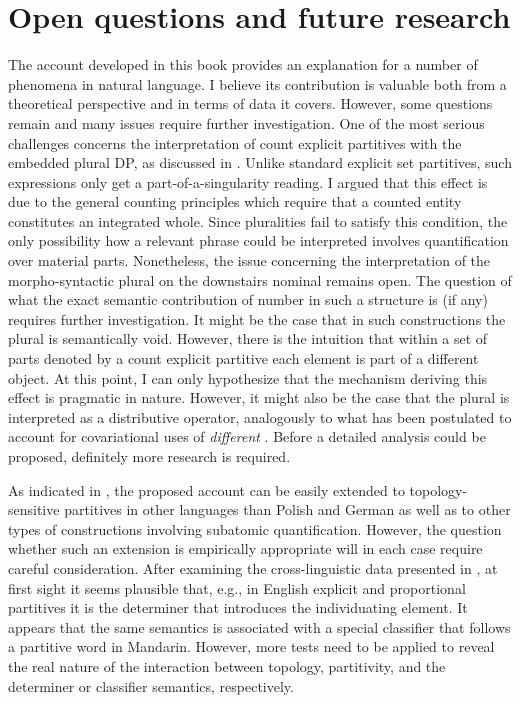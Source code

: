 \section{Open questions and future research}\label{sec:open-questions-and-future-research}

The account developed in this book provides an explanation for a number of phenomena in natural language. I believe its contribution is valuable both from a theoretical perspective and in terms of data it covers. However, some questions remain and many issues require further investigation. One of the most serious challenges concerns the interpretation of count explicit partitives with the embedded plural DP, as discussed in . Unlike standard explicit set partitives, such expressions only get a part-of-a-singularity reading. I argued that this effect is due to the general counting principles which require that a counted entity constitutes an integrated whole. Since pluralities fail to satisfy this condition, the only possibility how a relevant phrase could be interpreted involves quantification over material parts. Nonetheless, the issue concerning the interpretation of the morpho-syntactic plural on the downstairs nominal remains open. The question of what the exact semantic contribution of number in such a structure is (if any) requires further investigation. It might be the case that in such constructions the plural is semantically void. However, there is the intuition that within a set of parts denoted by a count explicit partitive each element is part of a different object. At this point, I can only hypothesize that the mechanism deriving this effect is pragmatic in nature. However, it might also be the case that the plural is interpreted as a distributive operator, analogously to what has been postulated to account for covariational uses of \textit{different} \citep[see, e.g.,][]{beck2000semantics,brasoveanu2008sentence,dotlacil2010anaphora}. Before a detailed analysis could be proposed, definitely more research is required.

As indicated in , the proposed account can be easily extended to topology-sensitive partitives in other languages than Polish and German as well as to other types of constructions involving subatomic quantification. However, the question whether such an extension is empirically appropriate will in each case require careful consideration. After examining the cross-linguistic data presented in  , at first sight it seems plausible that, e.g., in English explicit and proportional partitives it is the determiner that introduces the individuating element. It appears that the same semantics is associated with a special classifier that follows a partitive word in Mandarin. However, more tests need to be applied to reveal the real nature of the interaction between topology, partitivity, and the determiner or classifier semantics, respectively. 


